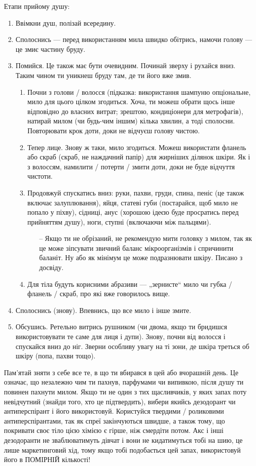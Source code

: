 Етапи прийому душу:
\begin{enumerate}
	\item Ввімкни душ, полізай всередину.
	\item Сполоснись — перед використанням мила швидко обітрись, намочи
	голову — це змиє частину бруду.
	\item Помийся. Це також має бути очевидним. Починай зверху і рухайся вниз.
	Таким чином ти уникнеш бруду там, де ти його вже змив.
	\begin{enumerate}
		\item Почни з голови / волосся (підказка: використання шампуню
		опціональне, мило для цього цілком згодиться. Хоча, ти можеш обрати
		щось інше відповідно до власних витрат; зрештою, кондиціонери для
		метрофагів), натирай милом (чи будь-чим іншим) кілька хвилин, а тоді
		сполосни. Повторювати крок доти, доки не відчуєш голову чистою.
		\item Тепер лице. Знову ж таки, мило згодиться. Можеш використати
		фланель або скраб (скраб, не наждачний папір) для жирніших ділянок
		шкіри. Як і з волоссям, намилити / потерти / змити доти, доки не буде
		відчуття чистоти.
		\item Продовжуй спускатись вниз: руки, пахви, груди, спина, пеніс
		(це також включає залуплювання), яйця, статеві губи (постарайся, щоб
		мило не попало у піхву), сідниці, анус (хорошою ідеєю буде просратись
		перед прийняттям душу), ноги, ступні (включаючи між пальцями).
		\begin{itemize}
			\item[--] Якщо ти не обрізаний, не рекомендую мити головку з милом,
			так як це може зіпсувати звичний баланс мікроорганізмів і
			спричинити баланіт. Ну або як мінімум це може подразнювати шкіру.
			Писано з досвіду.
		\end{itemize}
		\item Для тіла будуть корисними абразиви — „зернисте“ мило чи губка /
		фланель / скраб, про які вже говорилось вище.
	\end{enumerate}
	\item Сполоснись (знову). Впевнись, що все мило і інше змите.
	\item Обсушись. Ретельно витрись рушником (чи двома, якщо ти бридишся
	використовувати те саме для лиця і дупи). Знову, почни від волосся і
	спускайся вниз до ніг. Зверни особливу увагу на ті зони, де шкіра треться
	об шкіру (попа, пахви тощо).
\end{enumerate}

Пам’ятай зняти з себе все те, в що ти вбирався в цей або вчорашній день. Це
означає, що незалежно чим ти пахнув, парфумами чи випивкою, після душу ти
повинен пахнути милом. Якщо ти не один з тих щасливчиків, у яких запах поту
невідчутний (знайди того, хто це підтвердить), вибери якийсь дезодорант чи
антиперспірант і його використовуй. Користуйся твердими / роликовими
антиперспірантами, так як спреї закінчуються швидше, а також тому, що покривати
своє тіло цією хімією є гірше, ніж смердіти потом. Акс і інші дезодоранти не
зваблюватимуть дівчат і вони не кидатимуться тобі на шию, це лише маркетинговий
хід, тому якщо тобі подобається цей запах, використовуй його в ПОМІРНІЙ
кількості!

